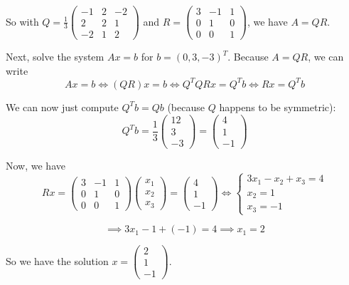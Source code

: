 \documentclass[12pt]{article}
\begin{document}
So with $Q = \frac{1}{3} \begin{pmatrix}
        -1 & 2 & -2 \\
        2 & 2 & 1 \\
        -2 & 1 & 2
    \end{pmatrix}$ and $R = \begin{pmatrix}
        3 & -1 & 1 \\
        0 & 1 & 0 \\
        0 & 0 & 1
    \end{pmatrix}$, we have $A = QR$.

Next, solve the system $Ax = b$ for $b = (0,3,-3)^T$. Because $A = QR$, we can write
$$
    Ax = b \iff (QR)x = b \iff Q^T QR x = Q^Tb \iff R x = Q^T b
$$

We can now just compute $Q^T b = Q b$ (because $Q$ happens to be symmetric):
$$
    Q^T b = \frac{1}{3} \begin{pmatrix} 12 \\ 3 \\ -3 \end{pmatrix} = \begin{pmatrix} 4 \\ 1 \\ -1 \end{pmatrix}
$$

Now, we have
$$
    R x = \begin{pmatrix}
        3 & -1 & 1 \\
        0 & 1 & 0 \\
        0 & 0 & 1
    \end{pmatrix} \begin{pmatrix} x_1 \\ x_2 \\ x_3 \end{pmatrix} = \begin{pmatrix} 4 \\ 1 \\ -1 \end{pmatrix} \iff \begin{cases}
        3x_1 - x_2 + x_3 = 4 \\
        x_2 = 1 \\
        x_3 = -1 
    \end{cases}
$$

$$
    \implies 3x_1 - 1 + (-1) = 4 \implies x_1 = 2 
$$

So we have the solution $x = \begin{pmatrix} 2 \\ 1 \\ -1 \end{pmatrix}$.
\end{document}
